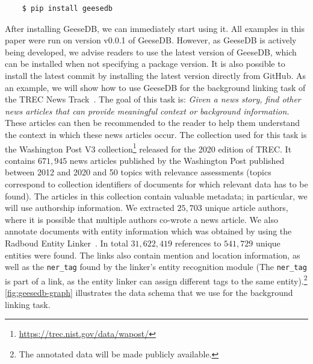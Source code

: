 \begin{verbatim}
	$ pip install geesedb
\end{verbatim}
After installing GeeseDB, we can immediately start using it. All examples in this paper were run on version v0.0.1 of GeeseDB. However, as GeeseDB is actively being developed, we advise readers to use the latest version of GeeseDB, which can be installed when not specifying a package version. It is also possible to install the latest commit by installing the latest version directly from GitHub.
As an example, we will show how to use GeeseDB for the background linking task of the TREC News Track~\citep{soboroff2018trec}. The goal of this task is: \textit{Given a news story, find other news articles that can provide meaningful context or background information.} These articles can then be recommended to the reader to help them understand the context in which these news articles occur. The collection used for this task is the Washington Post V3 collection\footnote{\url{https://trec.nist.gov/data/wapost/}} released for the 2020 edition of TREC. It contains $671,945$ news articles published by the Washington Post published between 2012 and 2020 and 50 topics with relevance assessments (topics correspond to collection identifiers of documents for which relevant data has to be found). The articles in this collection contain valuable metadata; in particular, we will use authorship information. We extracted $25,703$ unique article authors, where it is possible that multiple authors co-wrote a news article. We also annotate documents with entity information which was obtained by using the Radboud Entity Linker~\citep{REL}. In total $31,622,419$ references to $541,729$ unique entities were found. The links also contain mention and location information, as well as the \texttt{ner\_tag} found by the linker's entity recognition module (The \texttt{ner\_tag} is part of a link, as the entity linker can assign different tags to the same entity).\footnote{The annotated data will be made publicly available.} \cref{fig:geesedb-graph} illustrates the data schema that we use for the background linking task. 


